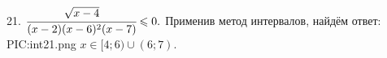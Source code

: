 21. $\cfrac{\sqrt{x-4}}{(x-2)(x-6)^2(x-7)}\leqslant0.$
Применив метод интервалов, найдём ответ:
{{PIC:int21.png}}
$x\in[4;6)\cup(6;7).$\\
